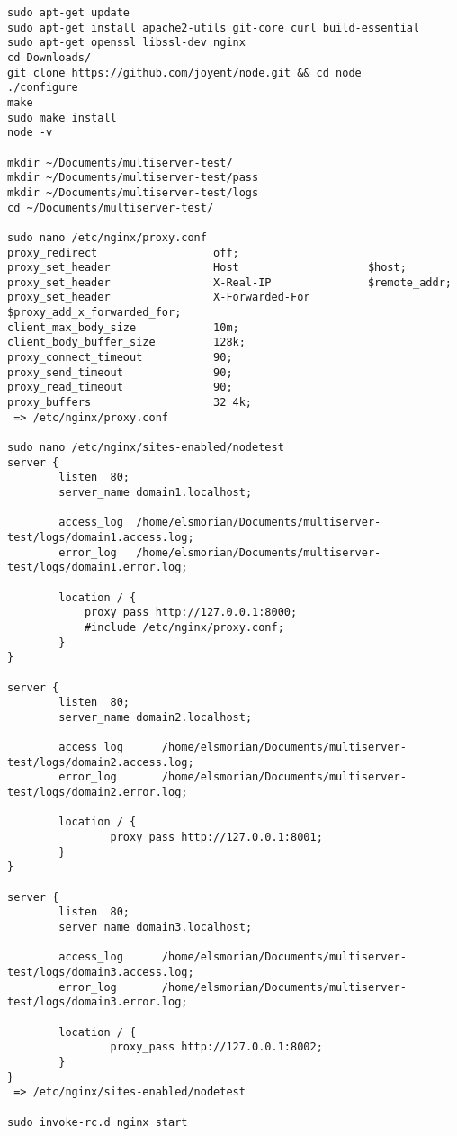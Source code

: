 \documentclass[A4paper,11pt]{article}
\begin{document}
\begin{lstlisting}
sudo apt-get update
sudo apt-get install apache2-utils git-core curl build-essential 
sudo apt-get openssl libssl-dev nginx
cd Downloads/
git clone https://github.com/joyent/node.git && cd node
./configure
make
sudo make install
node -v

mkdir ~/Documents/multiserver-test/
mkdir ~/Documents/multiserver-test/pass
mkdir ~/Documents/multiserver-test/logs
cd ~/Documents/multiserver-test/

sudo nano /etc/nginx/proxy.conf
proxy_redirect                  off;
proxy_set_header                Host                    $host;
proxy_set_header                X-Real-IP               $remote_addr;
proxy_set_header                X-Forwarded-For         $proxy_add_x_forwarded_for;
client_max_body_size            10m;
client_body_buffer_size         128k;
proxy_connect_timeout           90;
proxy_send_timeout              90;
proxy_read_timeout              90;
proxy_buffers                   32 4k;
 => /etc/nginx/proxy.conf

sudo nano /etc/nginx/sites-enabled/nodetest
server {
	    listen	80;
	    server_name domain1.localhost;

	    access_log 	/home/elsmorian/Documents/multiserver-test/logs/domain1.access.log;
	    error_log	/home/elsmorian/Documents/multiserver-test/logs/domain1.error.log;
	
	    location / {
		    proxy_pass http://127.0.0.1:8000;
		    #include /etc/nginx/proxy.conf;
	    }
}

server {
        listen  80;
        server_name domain2.localhost;

        access_log      /home/elsmorian/Documents/multiserver-test/logs/domain2.access.log;
        error_log       /home/elsmorian/Documents/multiserver-test/logs/domain2.error.log;

        location / {
                proxy_pass http://127.0.0.1:8001;
        }
}

server {
        listen  80;
        server_name domain3.localhost;

        access_log      /home/elsmorian/Documents/multiserver-test/logs/domain3.access.log;
        error_log       /home/elsmorian/Documents/multiserver-test/logs/domain3.error.log;

        location / {
                proxy_pass http://127.0.0.1:8002;
        }
}
 => /etc/nginx/sites-enabled/nodetest

sudo invoke-rc.d nginx start


\end{lstlisting}
\end{document}
